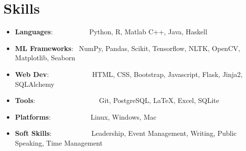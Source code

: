 \documentclass[a4paper,20pt]{article}
\makeatletter
\newcommand{\resumeItem}[2]{
  \item\small{
    \textbf{#1}{: #2 \vspace{-2pt}}
  }
}
\newcommand{\resumeSubheading}[4]{
  \vspace{-1pt}\item
    \begin{tabular*}{0.97\textwidth}{l@{\extracolsep{\fill}}r}
      \textbf{#1} & #2 \\
      \textit{#3} & \textit{#4} \\
    \end{tabular*}\vspace{-5pt}
}
\newcommand{\resumeSubItem}[2]{\resumeItem{#1}{#2}\vspace{-3pt}}
\newcommand{\resumeSubHeadingListStart}{\begin{itemize}[leftmargin=*]}
\newcommand{\resumeSubHeadingListEnd}{\end{itemize}}
\makeatother
\begin{document}
\section{Skills}
	\resumeSubHeadingListStart
	\resumeSubItem{Languages}{~~~~~~~~~~Python, R, Matlab C++, Java, Haskell}
	\resumeSubItem{ML Frameworks}{~NumPy, Pandas, Scikit, Tensorflow, NLTK, OpenCV, Matplotlib, Seaborn}
	\resumeSubItem{Web Dev}{~~~~~~~~~~~~HTML, CSS, Bootstrap, Javascript, Flask, Jinja2, SQLAlchemy}
	\resumeSubItem{Tools}{~~~~~~~~~~~~~~~~~~Git, PostgreSQL, \LaTeX, Excel, SQLite}
	\resumeSubItem{Platforms}{~~~~~~~~~~~Linux, Windows, Mac}
	\resumeSubItem{Soft Skills}{~~~~~~~~~~~Leadership, Event Management, Writing, Public Speaking, Time Management}

\resumeSubHeadingListEnd
\vspace{-5pt}






\begin{comment}
\vspace{-5pt}
\section{Publications}
\resumeSubHeadingListStart
\resumeSubItem{Book: Deep Learning on Web (Web Development, Deep Learning)}{Work in Progress book to be published by Packt Publishing in late 2019. Tech: Django, Python, AWS, GCP, Azure (November '18)}
\vspace{2pt}
\resumeSubItem{Book: Deep Learning on Mobile Devices (Flutter App Development, Deep Learning)}{Work in Progress book to be published by Packt Publishing in late 2019. Tech: Flutter, Android, Firebase, TensorFlow, Python, Dart (December '18)}
\resumeSubHeadingListEnd
\end{comment}




\begin{comment}
\vspace{-5pt}
\section{Volunteer Experience}
  \resumeSubHeadingListStart
	\resumeSubheading
    {Community Lead at Developer Student Clubs NSEC}{Kolkata, India}
    {Conducted online and offline technical \& soft-skills training impacting over 3000 students.}{Jan 2019 - Present}
\vspace{5pt}
    \resumeSubheading
    {Event Organizer at Google Developers Group Kolkata}{Kolkata, India}
    {Organized events, conducted workshops and delivered workshops reaching over 7000 developers.}{Jan 2018 - Present}
\resumeSubHeadingListEnd
\end{comment}
\end{document}
